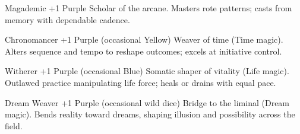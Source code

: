 \ClassCard
  {Magademic}
  {+1 Purple}
  {Scholar of the arcane.}
  {Masters rote patterns; casts from memory with dependable cadence.}

\noindent{}\par\vspace{5mm}

\ClassCard
  {Chronomancer}
  {+1 Purple (occasional Yellow)}
  {Weaver of time (Time magic).}
  {Alters sequence and tempo to reshape outcomes; excels at initiative control.}

\ClassCard
  {Witherer}
  {+1 Purple (occasional Blue)}
  {Somatic shaper of vitality (Life magic).}
  {Outlawed practice manipulating life force; heals or drains with equal pace.}

\ClassCard
  {Dream Weaver}
  {+1 Purple (occasional wild dice)}
  {Bridge to the liminal (Dream magic).}
  {Bends reality toward dreams, shaping illusion and possibility across the field.}
